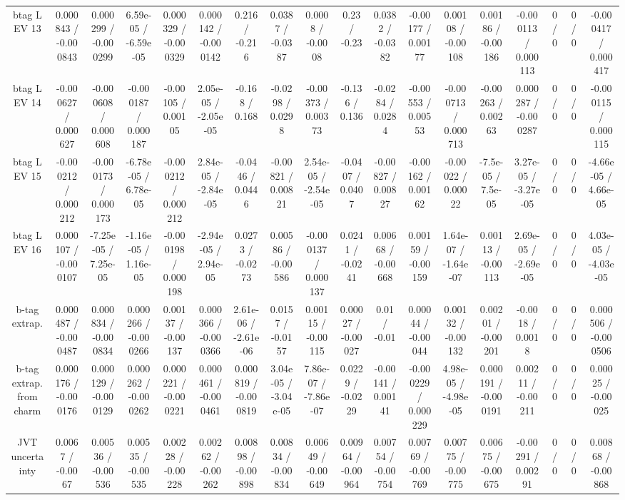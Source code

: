 \documentclass[10pt]{article}
\begin{document}
\begin{table}[htbp]
\begin{center}
\begin{tabular}{|c|c|c|c|c|c|c|c|c|c|c|c|c|c|c|c|c|c|}
  btag L EV 13 & 0.000843 / -0.000843 & 0.000299 / -0.000299 & 6.59e-05 / -6.59e-05 & 0.000329 / -0.000329 & 0.000142 / -0.000142 & 0.216 / -0.216 & 0.0387 / -0.0387 & 0.0008 / -0.0008 & 0.23 / -0.23 & 0.0382 / -0.0382 & -0.00177 / 0.00177 & 0.00108 / -0.00108 & 0.00186 / -0.00186 & -0.000113 / 0.000113 & 0 / 0 & 0 / 0 & -0.000417 / 0.000417 \\ 
  btag L EV 14 & -0.000627 / 0.000627 & -0.000608 / 0.000608 & -0.000187 / 0.000187 & -0.00105 / 0.00105 & 2.05e-05 / -2.05e-05 & -0.168 / 0.168 & -0.0298 / 0.0298 & -0.00373 / 0.00373 & -0.136 / 0.136 & -0.0284 / 0.0284 & -0.00553 / 0.00553 & -0.000713 / 0.000713 & -0.00263 / 0.00263 & 0.000287 / -0.000287 & 0 / 0 & 0 / 0 & -0.000115 / 0.000115 \\ 
  btag L EV 15 & -0.000212 / 0.000212 & -0.000173 / 0.000173 & -6.78e-05 / 6.78e-05 & -0.000212 / 0.000212 & 2.84e-05 / -2.84e-05 & -0.0446 / 0.0446 & -0.00821 / 0.00821 & 2.54e-05 / -2.54e-05 & -0.0407 / 0.0407 & -0.00827 / 0.00827 & -0.00162 / 0.00162 & -0.00022 / 0.00022 & -7.5e-05 / 7.5e-05 & 3.27e-05 / -3.27e-05 & 0 / 0 & 0 / 0 & -4.66e-05 / 4.66e-05 \\ 
  btag L EV 16 & 0.000107 / -0.000107 & -7.25e-05 / 7.25e-05 & -1.16e-05 / 1.16e-05 & -0.000198 / 0.000198 & -2.94e-05 / 2.94e-05 & 0.0273 / -0.0273 & 0.00586 / -0.00586 & -0.000137 / 0.000137 & 0.0241 / -0.0241 & 0.00668 / -0.00668 & 0.00159 / -0.00159 & 1.64e-07 / -1.64e-07 & 0.00113 / -0.00113 & 2.69e-05 / -2.69e-05 & 0 / 0 & 0 / 0 & 4.03e-05 / -4.03e-05 \\ 
  b-tag extrap. & 0.000487 / -0.000487 & 0.000834 / -0.000834 & 0.000266 / -0.000266 & 0.00137 / -0.00137 & 0.000366 / -0.000366 & 2.61e-06 / -2.61e-06 & 0.0157 / -0.0157 & 0.00115 / -0.00115 & 0.00027 / -0.00027 & 0.01 / -0.01 & 0.00044 / -0.00044 & 0.00132 / -0.00132 & 0.00201 / -0.00201 & -0.0018 / 0.0018 & 0 / 0 & 0 / 0 & 0.000506 / -0.000506 \\ 
  b-tag extrap. from charm & 0.000176 / -0.000176 & 0.000129 / -0.000129 & 0.000262 / -0.000262 & 0.000221 / -0.000221 & 0.000461 / -0.000461 & 0.000819 / -0.000819 & 3.04e-05 / -3.04e-05 & 7.86e-07 / -7.86e-07 & 0.0229 / -0.0229 & -0.00141 / 0.00141 & -0.000229 / 0.000229 & 4.98e-05 / -4.98e-05 & 0.000191 / -0.000191 & 0.00211 / -0.00211 & 0 / 0 & 0 / 0 & 0.00025 / -0.00025 \\ 
  JVT uncertainty & 0.0067 / -0.0067 & 0.00536 / -0.00536 & 0.00535 / -0.00535 & 0.00228 / -0.00228 & 0.00262 / -0.00262 & 0.00898 / -0.00898 & 0.00834 / -0.00834 & 0.00649 / -0.00649 & 0.00964 / -0.00964 & 0.00754 / -0.00754 & 0.00769 / -0.00769 & 0.00775 / -0.00775 & 0.00675 / -0.00675 & -0.00291 / 0.00291 & 0 / 0 & 0 / 0 & 0.00868 / -0.00868 \\ 

\end{tabular}
\end{center}
\end{table}
\end{document}

